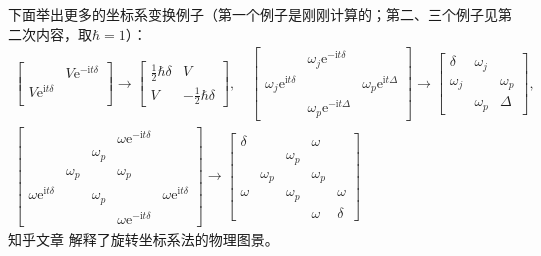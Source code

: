 \documentclass[
fontsetup = font-setup-open.tex,
titlesetup = titles-setup.tex
]{AJbook}
\numberwithin{equation}{section}
\begin{document}
下面举出更多的坐标系变换例子（第一个例子是刚刚计算的；第二、三个例子见第二次内容，取$ \hbar=1 $）：
\begin{equation}\label{key}
\begin{gathered}
\begin{bmatrix}
&V\mathrm{e}^{-\mathrm{i}t\delta}\\
V\mathrm{e}^{\mathrm{i}t\delta}&\\
\end{bmatrix}\to
\begin{bmatrix}
\frac{1}{2}\hbar\delta & V \\
V & -\frac{1}{2}\hbar\delta
\end{bmatrix},\quad
\begin{bmatrix}
 & \omega_j\mathrm{e}^{-\mathrm{i}t\delta} &  \\
\omega_j\mathrm{e}^{\mathrm{i}t\delta} &  & \omega_p\mathrm{e}^{\mathrm{i}t\Delta} \\
 & \omega_p\mathrm{e}^{-\mathrm{i}t\Delta} & 
\end{bmatrix}\to
\begin{bmatrix}
\delta & \omega_j &  \\
\omega_j &  & \omega_p \\
 & \omega_p & \Delta
\end{bmatrix},\\
\begin{bmatrix}
 &  &  & \omega\mathrm{e}^{-\mathrm{i}t\delta} &  \\
 &  & \omega_p &  &  \\
 & \omega_p &  & \omega_p &  \\
\omega\mathrm{e}^{\mathrm{i}t\delta} &  & \omega_p &  & \omega\mathrm{e}^{\mathrm{i}t\delta} \\
 &  &  & \omega\mathrm{e}^{-\mathrm{i}t\delta} & 
\end{bmatrix}\to
\begin{bmatrix}
\delta &  &  & \omega &  \\
 &  & \omega_p &  &  \\
 & \omega_p &  & \omega_p &  \\
\omega &  & \omega_p &  & \omega \\
 &  &  & \omega & \delta
\end{bmatrix}
\end{gathered}
\end{equation}
知乎文章 \cite{rotatecoordsys} 解释了旋转坐标系法的物理图景。
\end{document}
